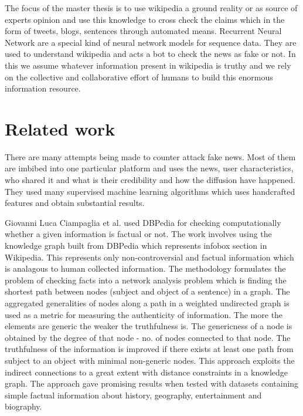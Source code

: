 \documentclass[a4paper, 11pt]{article}
\begin{document}
The focus of the master thesis is to use wikipedia a ground reality or as source of experts opinion and use this knowledge to cross check the claims which in the form of tweets, blogs, sentences through automated means. Recurrent Neural Network are a special kind of neural network models for sequence data. They are used to understand wikipedia and acts a bot to check the news as fake or not. In this we assume whatever information present in wikipedia is truthy and we rely on the collective and collaborative effort of humans to build this enormous information resource.
\section{Related work}

There are many attempts being made to counter attack fake news. Most of them are imbibed into one particular platform and uses the news, user characteristics, who shared it and what is their credibility and how the diffusion have happened. They used many supervised machine learning algorithms which uses handcrafted features and obtain substantial results. 

Giovanni Luca Ciampaglia et al. used DBPedia for checking computationally whether a given information is factual or not. The work involves using the knowledge graph built from DBPedia which represents infobox section in Wikipedia. This represents only non-controversial and factual information which is analagous to human collected information. The methodology formulates the problem of checking facts into a network analysis problem which is finding the shortest path between nodes (subject and object of a sentence) in a graph. The aggregated generalities of nodes along a path in a weighted undirected graph is used as a metric for measuring the authenticity of information. The more the elements are generic the weaker the truthfulness is.  The genericness of a node is obtained by the degree of that node - no. of nodes connected to that node. The truthfulness of the information is improved if there exists at least one path from subject to an object with minimal non-generic nodes. This approach exploits the indirect connections to a great extent with distance constraints in a knowledge graph. The approach gave promising results when tested with datasets containing simple factual information about history, geography, entertainment and biography. 

\end{document}
